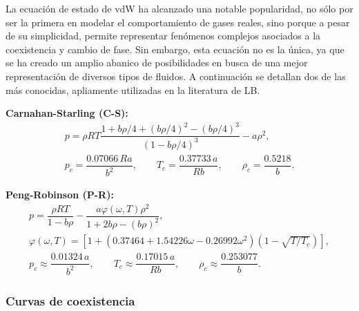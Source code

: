 La ecuaci\'on de estado de vdW ha alcanzado una notable popularidad, no s\'olo por ser la primera en modelar el comportamiento de gases reales, sino porque a pesar de su simplicidad, permite representar fen\'omenos complejos asociados a la coexistencia y cambio de fase. Sin embargo, esta ecuaci\'on no es la \'unica, ya que se ha creado un amplio abanico de posibilidades en busca de una mejor representaci\'on de diversos tipos de fluidos. A continuaci\'on se detallan dos de las m\'as conocidas, apliamente utilizadas en la literatura de LB.

\smallskip
\textbf{Carnahan-Starling (C-S):}
\begin{equation}
	\begin{gathered}
		p = \rho R T\dfrac{1+b\rho/4+(b\rho/4)^2-(b\rho/4)^3}{(1-b\rho/4)^3} - a\rho^2, \\[2mm]
		p_c = \dfrac{0.07066 \, Ra}{b^2}, \qquad T_c = \dfrac{0.37733 \, a}{Rb}, \qquad \rho_c = \dfrac{0.5218}{b}.
	\end{gathered}
	\label{eq:CS_eos}
\end{equation}


\textbf{Peng-Robinson (P-R):}
\begin{equation}
	\begin{gathered}
		p = \dfrac{\rho R T}{1-b\rho} - \dfrac{a\varphi(\omega,T)\rho^2}{1+2b\rho-(b\rho)^2}, \\[0mm]
		\varphi(\omega,T) = \left[ 1+(0.37464+1.54226\omega-0.26992\omega^2)(1-\sqrt{T/T_c})\right], \\[0mm]
		p_c \approx \dfrac{0.01324 \, a}{b^2}, \qquad
		T_c \approx \dfrac{0.17015 \, a}{Rb}, \qquad
		\rho_c \approx \dfrac{0.253077}{b}.
	\end{gathered}
	\label{eq:PR_eos}
\end{equation}



\subsubsection*{Curvas de coexistencia}

